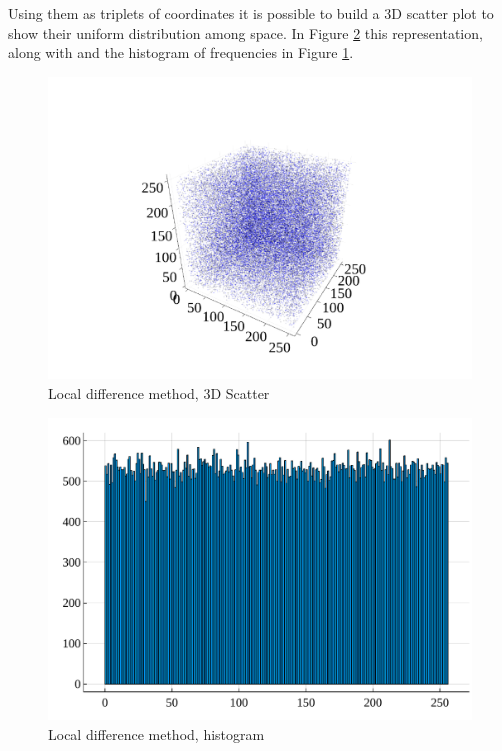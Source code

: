 \documentclass[10pt, final]{article}
\begin{document}
\begin{multicols}{2}
Using them as triplets of coordinates it is possible to build a 3D scatter plot to show their uniform distribution among space. In Figure \ref{local} this representation, along with and the histogram of frequencies in Figure \ref{loca}.
\begin{mdframed}
    \begin{figure}[H]
            \centering
            \includegraphics[width = \textwidth]{../random_img/d2-scatter3d.pdf}
            \caption{Local difference method, 3D Scatter}
            \label{loca}
        \end{figure}
    \end{mdframed}
    \begin{mdframed}

        \begin{figure}[H]
            \centering
            \includegraphics[width = \textwidth]{../random_img/d2-histogram.pdf}
        \caption{Local difference method, histogram}
        \label{local}
    \end{figure}
\end{mdframed}


\end{multicols}
\end{document}
